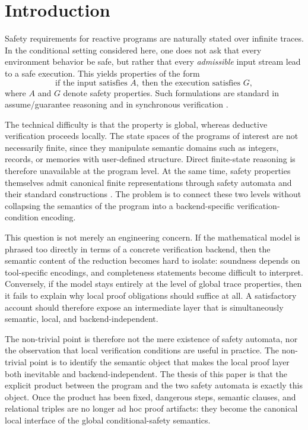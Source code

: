 \documentclass[acmsmall,screen]{acmart}
\theoremstyle{leftplain}
\theoremstyle{leftdefinition}
\theoremstyle{leftremark}
\begin{document}
\section{Introduction}
Safety requirements for reactive programs are naturally stated over infinite
traces. In the conditional setting considered here, one does not ask that every
environment behavior be safe, but rather that every \emph{admissible} input
stream lead to a safe execution. This yields properties of the form
\[
  \text{if the input satisfies } A,\ \text{then the execution satisfies } G,
\]
where $A$ and $G$ denote safety properties. Such formulations are standard in
assume/guarantee reasoning and in synchronous verification
\cite{pnueli-1977,halbwachs-1991,berry-benveniste-sync}.

The technical difficulty is that the property is global, whereas deductive
verification proceeds locally. The state spaces of the programs of interest are
not necessarily finite, since they manipulate semantic domains such as
integers, records, or memories with user-defined structure. Direct finite-state
reasoning is therefore unavailable at the program level. At the same time,
safety properties themselves admit canonical finite representations through
safety automata and their standard constructions
\cite{alpern-schneider,kupferman-vardi-safety,gastin-oddoux}. The problem is
to connect these two levels without collapsing the semantics of the program
into a backend-specific verification-condition encoding.

This question is not merely an engineering concern. If the mathematical model
is phrased too directly in terms of a concrete verification backend, then the
semantic content of the reduction becomes hard to isolate: soundness depends on
tool-specific encodings, and completeness statements become difficult to
interpret. Conversely, if the model stays entirely at the level of global trace
properties, then it fails to explain why local proof obligations should suffice
at all. A satisfactory account should therefore expose an intermediate layer
that is simultaneously semantic, local, and backend-independent.

The non-trivial point is therefore not the mere existence of safety automata,
nor the observation that local verification conditions are useful in practice.
The non-trivial point is to identify the semantic object that makes the local
proof layer both inevitable and backend-independent. The thesis of this paper
is that the explicit product between the program and the two safety automata is
exactly this object. Once the product has been fixed, dangerous steps,
semantic clauses, and relational triples are no longer ad hoc proof artifacts:
they become the canonical local interface of the global conditional-safety
semantics.
\end{document}
